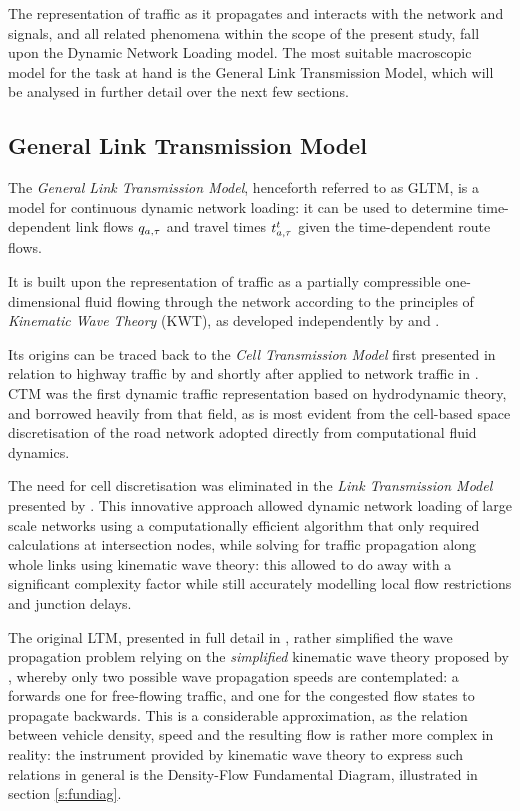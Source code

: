 The representation of traffic as it propagates and interacts with the network and signals, and all related phenomena within the scope of the present study, fall upon the Dynamic Network Loading model.
The most suitable macroscopic model for the task at hand is the General Link Transmission Model, which will be analysed in further detail over the next few sections.

\subsection{General Link Transmission Model}
The \emph{General Link Transmission Model}, henceforth referred to as GLTM, is a model for continuous dynamic network loading: it can be used to determine time-dependent link flows $q_{a,\tau}$ and travel times $t_{a,\tau}^t$ given the time-dependent route flows.

It is built upon the representation of traffic as a partially compressible one-dimensional fluid flowing through the network according to the principles of \emph{Kinematic Wave Theory} (KWT), as developed independently by \cite{lighthill1955kinematic} and \cite{richards1956shock}.

Its origins can be traced back to the \emph{Cell Transmission Model} first presented in relation to highway traffic by \cite{daganzo1994cell} and shortly after applied to network traffic in \citep{daganzo1995cell}. CTM was the first dynamic traffic representation based on hydrodynamic theory, and borrowed heavily from that field, as is most evident from the cell-based space discretisation of the road network adopted directly from computational fluid dynamics.

The need for cell discretisation was eliminated in the \emph{Link Transmission Model} presented by \cite{yperman2005link}. This innovative approach allowed dynamic network loading of large scale networks using a computationally efficient algorithm that only required calculations at intersection nodes, while solving for traffic propagation along whole links using kinematic wave theory: this allowed to do away with a significant complexity factor while still accurately modelling local flow restrictions and junction delays.

The original LTM, presented in full detail in \cite{yperman2007link}, rather simplified the wave propagation problem relying on the \emph{simplified} kinematic wave theory proposed by \citep{newell1993simplified}, whereby only two possible wave propagation speeds are contemplated: a forwards one for free-flowing traffic, and one for the congested flow states to propagate backwards.
This is a considerable approximation, as the relation between vehicle density, speed and the resulting flow is rather more complex in reality:
the instrument provided by kinematic wave theory to express such relations in general is the Density-Flow Fundamental Diagram, illustrated in section \ref{s:fundiag}.

